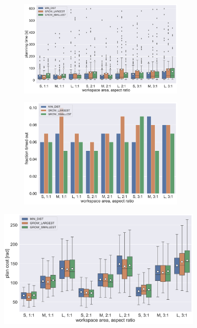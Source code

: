\begin{figure}
	\centering
	\begin{subfigure}[b]{\textwidth}
		\centering
		\includegraphics[width=0.9\textwidth]{figures/plots/AFBS_time.pdf}
		\caption{}
		\label{fig:AFBS_time}
	\end{subfigure}
	
	\begin{subfigure}[b]{\textwidth}
		\centering
		\includegraphics[width=0.9\textwidth]{figures/plots/AFBS_timeout.pdf}
		\caption{}
		\label{fig:AFBS_timeout}
	\end{subfigure}
	\caption[]{}
	\label{fig:AFBS_timestats}
\end{figure}

\begin{figure}
	\centering
	\includegraphics[width=0.9\textwidth]{figures/plots/AFBS_cost.pdf}
	\caption[]{}
	\label{fig:AFBS_cost}
\end{figure}



